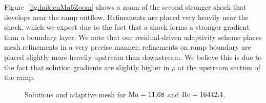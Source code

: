 Figure~\ref{fig:holdenMa6Zoom} shows a zoom of the second stronger shock that develops near the ramp outflow.  Refinements are placed very heavily near the shock, which we expect due to the fact that a shock forms a stronger gradient than a boundary layer.  We note that our residual-driven adaptivity scheme places mesh refinements in a very precise manner; refinements on ramp boundary are placed slightly more heavily upstream than downstream.  We believe this is due to the fact that solution gradients are slightly higher in $\rho$ at the upstream section of the ramp.  

\begin{figure}
\centering
{}
\caption{Solutions and adaptive mesh for ${\rm Ma} = 11.68$ and $\Reyn = 16442.4$.}
\label{fig:holdenMa11}
\end{figure}

